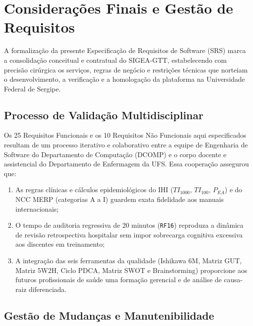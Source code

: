 \chapter{Considerações Finais e Gestão de Requisitos}
\label{cap_consideracoes_finais}

A formalização da presente Especificação de Requisitos de Software (SRS) marca a consolidação conceitual e contratual do SIGEA-GTT, estabelecendo com precisão cirúrgica os serviços, regras de negócio e restrições técnicas que norteiam o desenvolvimento, a verificação e a homologação da plataforma na Universidade Federal de Sergipe.

\section{Processo de Validação Multidisciplinar}
\label{sec_validacao_multidisciplinar}

Os 25 Requisitos Funcionais e os 10 Requisitos Não Funcionais aqui especificados resultam de um processo iterativo e colaborativo entre a equipe de Engenharia de Software do Departamento de Computação (DCOMP) e o corpo docente e assistencial do Departamento de Enfermagem da UFS. Essa cooperação assegurou que:
\begin{enumerate}
    \item As regras clínicas e cálculos epidemiológicos do IHI ($TI_{1000}$, $TI_{100}$, $P_{EA}$) e do NCC MERP (categorias A a I) guardem exata fidelidade aos manuais internacionais;
    \item O tempo de auditoria regressiva de 20 minutos (\texttt{RF16}) reproduza a dinâmica de revisão retrospectiva hospitalar sem impor sobrecarga cognitiva excessiva aos discentes em treinamento;
    \item A integração das seis ferramentas da qualidade (Ishikawa 6M, Matriz GUT, Matriz 5W2H, Ciclo PDCA, Matriz SWOT e Brainstorming) proporcione aos futuros profissionais de saúde uma formação gerencial e de análise de causa-raiz diferenciada.
\end{enumerate}

\section{Gestão de Mudanças e Manutenibilidade}
\label{sec_gestao_mudancas}

